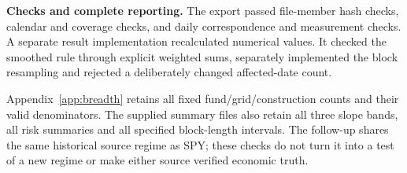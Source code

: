\textbf{Checks and complete reporting.} The export passed  file-member hash checks, calendar and coverage checks, and daily correspondence and measurement checks. A separate result implementation recalculated  numerical values. It checked the smoothed rule through explicit weighted sums, separately implemented the block resampling and rejected a deliberately changed affected-date count.

Appendix~\ref{app:breadth} retains all fixed fund/grid/construction counts and their valid denominators. The supplied summary files also retain all three slope bands, all risk summaries and all specified block-length intervals. The follow-up shares the same historical source regime as SPY; these checks do not turn it into a test of a new regime or make either source verified economic truth.


